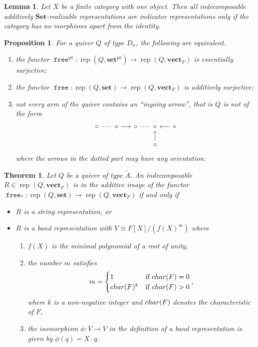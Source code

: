\documentclass[10pt,a4paper]{amsart}
\newtheorem{theorem}{Theorem}
\newtheorem{lemma}{Lemma}
\newtheorem{proposition}{Proposition}
\newcommand{\Set}{\mathbf{Set}}
\newcommand{\funct}[1]{\operatorname{\mathtt{#1}}}
\newcommand{\pset}{\mathbf{set}^\mathrm{pt}}
\DeclareMathOperator{\rep}{rep}
\newcommand{\set}{\mathbf{set}}
\newcommand{\vectF}{\mathbf{vect}_F}
\begin{document}
\begin{lemma} \label{lemma:indicator_for_monoids}
Let \( X \) be a finite category with one object. Then all indecomposable additively \( \Set \)-realizable representations are indicator representations only if the category has no morphisms apart from the identity.
\end{lemma}

\begin{proposition} \label{prop:when_is_Dn_realizable}
For a quiver \( Q \) of type \( D_n \), the following are equivalent.
\begin{enumerate}
\item the functor \( \funct{free}^\mathrm{pt} \colon \rep( Q, \pset) \to \rep( Q, \vectF) \)
is essentially surjective;
\item the functor \( \funct{free} \colon \rep( Q, \set) \to \rep( Q, \vectF) \)
is additively surjective;
\item not every arm of the quiver contains an ``ingoing arrow'', that is \( Q \) is not of the form
\[ \begin{tikzcd}[sep=5mm]
\circ \ar[r,-,dotted,very thick] & \circ \ar[r] & \circ \ar[r,-,dotted,very thick] & \circ & \circ \ar[l] \\
&&& \circ \ar[u] 
\end{tikzcd} \]
where the arrows in the dotted part may have any orientation.
\end{enumerate}
\end{proposition}

\begin{theorem}\label{thm.Ainf}
Let \( Q \) be a quiver of type \( \tilde A \). An indecomposable \( R \in \rep( Q, \vectF) \) is in the additive image of the functor \( \funct{free}_* \colon \rep( Q, \set ) \to \rep( Q, \vectF ) \) if and only if
\begin{itemize}
\item $R$ is a string representation, or
\item $R$ is a band representation with $V\cong F[X]/(f(X)^m)$ where
\begin{enumerate}
\item $f(X)$ is the minimal polynomial of a root of unity,
\item the number $m$ satisfies
\[ m = \begin{cases} 1 & \text{if ${\rm char}(F) = 0$} \\ {\rm char}(F)^k & \text{if ${\rm char}(F) > 0$}\end{cases},\]
where $k$ is a non-negative integer and ${\rm char}(F)$ denotes the characteristic of $F$, 
\item the isomorphism $\phi\colon V\to V$ in the definition of a band representation is given by $\phi(q) = X\cdot q$.
\end{enumerate}
\end{itemize}
\end{theorem}
\end{document}
